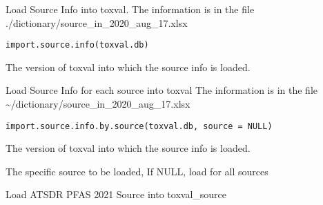 \documentclass[letterpaper]{book}
\begin{document}
%
\begin{Description}\relax
Load Source Info into toxval. 
The information is in the file ./dictionary/source\_in\_2020\_aug\_17.xlsx
\end{Description}
%
\begin{Usage}
\begin{verbatim}
import.source.info(toxval.db)
\end{verbatim}
\end{Usage}
%
\begin{Arguments}
\begin{ldescription}
\item[\code{toxval.db}] The version of toxval into which the source info is loaded.
\end{ldescription}
\end{Arguments}
%
\begin{Description}\relax
Load Source Info for each source into toxval
The information is in the file \textasciitilde{}/dictionary/source\_in\_2020\_aug\_17.xlsx
\end{Description}
%
\begin{Usage}
\begin{verbatim}
import.source.info.by.source(toxval.db, source = NULL)
\end{verbatim}
\end{Usage}
%
\begin{Arguments}
\begin{ldescription}
\item[\code{toxval.db}] The version of toxval into which the source info is loaded.

\item[\code{source}] The specific source to be loaded, If NULL, load for all sources
\end{ldescription}
\end{Arguments}
%
\begin{Description}\relax
Load ATSDR PFAS 2021 Source into toxval\_source
\end{Description}
\end{document}
